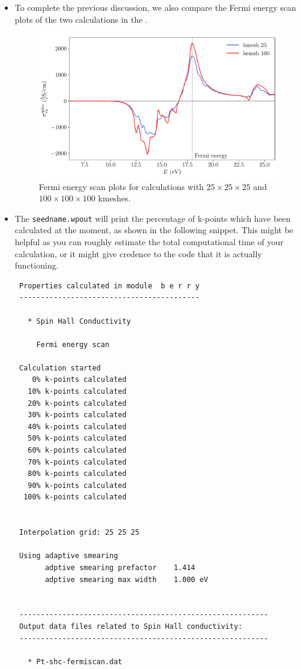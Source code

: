 \begin{itemize}
\item To complete the previous discussion, we also 
compare the Fermi energy scan plots of the two calculations in the . 
\begin{figure}[htb!]
\centering
\includegraphics[width=.8\columnwidth]{figure/example29/pt_shc_kmesh.pdf}
\caption{Fermi energy scan plots for calculations 
	with $25\times25\times25$ and $100\times100\times100$ kmeshes.}
\label{fig29.3}
\end{figure}

\item The {\tt seedname.wpout} will print the percentage of k-points which 
have been calculated at the moment, as 
shown in the following snippet. 
This might be helpful as you can roughly 
estimate the total computational time 
of your calculation, or it might give credence to the code that it is actually functioning.
\begin{tcolorbox}[title=Pt.wpout,sharp corners,boxrule=0.5pt]
{\small
\begin{verbatim}
 Properties calculated in module  b e r r y
 ------------------------------------------

   * Spin Hall Conductivity

     Fermi energy scan
 
 Calculation started
    0% k-points calculated
   10% k-points calculated
   20% k-points calculated
   30% k-points calculated
   40% k-points calculated
   50% k-points calculated
   60% k-points calculated
   70% k-points calculated
   80% k-points calculated
   90% k-points calculated
  100% k-points calculated


 Interpolation grid: 25 25 25

 Using adaptive smearing
       adptive smearing prefactor    1.414
       adptive smearing max width    1.000 eV


 ----------------------------------------------------------
 Output data files related to Spin Hall conductivity:
 ----------------------------------------------------------

   * Pt-shc-fermiscan.dat
\end{verbatim}
}
\end{tcolorbox}

\end{itemize}

